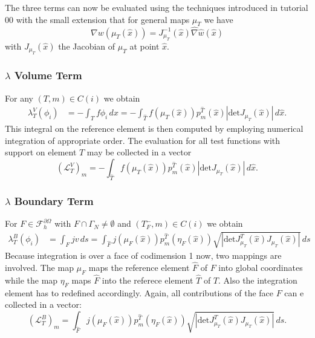 \documentclass[a4paper,12pt]{article}
\begin{document}
The three terms can now be evaluated using the techniques introduced in 
tutorial 00 with the small extension that for general maps $\mu_T$ we
have 
$$\nabla w(\mu_T(\hat x)) = J_{\mu_T}^{-1}(\hat x) \hat\nabla \hat w (\hat x)$$
with $J_{\mu_T}(\hat x)$ the Jacobian of $\mu_T$ at point $\hat x$.

\subsubsection*{$\lambda$ Volume Term}

For any $(T,m)\in C(i)$ we obtain
\begin{equation*}
\begin{split}
\lambda_T^V(\phi_i) &= - \int_T f \phi_i \,dx = 
- \int_{\hat T} f(\mu_T(\hat x)) p_m^{\hat T}(\hat x) |\text{det} J_{\mu_T}(\hat x)|\, d\hat x .
\end{split}
\end{equation*}
This integral on the reference element is then computed by employing
numerical integration of appropriate order.
The evaluation for all test functions with support on element $T$ may be collected in
a vector 
\begin{equation*}
(\mathcal{L}_T^V)_m = - \int_{\hat T} f(\mu_T(\hat x)) p_m^{\hat T}(\hat x) 
|\text{det} J_{\mu_T}(\hat x)|\, d\hat x.
\end{equation*}

\subsubsection*{$\lambda$ Boundary Term}

For $F\in\mathcal{F}_h^{\partial\Omega}$ with $F\cap\Gamma_N\neq\emptyset$
and $(T_F^-,m)\in C(i)$ we obtain
\begin{equation*}
\begin{split}
\lambda_T^B(\phi_i) &= \int_{F} j v\,ds = 
\int_{\hat F} j(\mu_F(\hat x)) p_m^{\hat T}(\eta_F(\hat x)) 
\sqrt{|\text{det} J^T_{\mu_T}(\hat x)J_{\mu_T}(\hat x)|} \,ds
\end{split}
\end{equation*}
Because integration is over a face of codimension 1 now, two mappings are
involved. The map $\mu_F$ maps the reference element $\hat F$ of $F$ into
global coordinates while the map $\eta_F$ maps $\hat F$ into the referece
element $\hat T$ of $T$. Also the integration element has to redefined accordingly.
Again, all contributions of the face $F$ can e collected in a vector:
\begin{equation*}
(\mathcal{L}_T^B)_m = 
\int_{\hat F} j(\mu_F(\hat x)) p_m^{\hat T}(\eta_F(\hat x)) 
\sqrt{|\text{det} J^T_{\mu_T}(\hat x)J_{\mu_T}(\hat x)|} \,ds .
\end{equation*}
\end{document}
